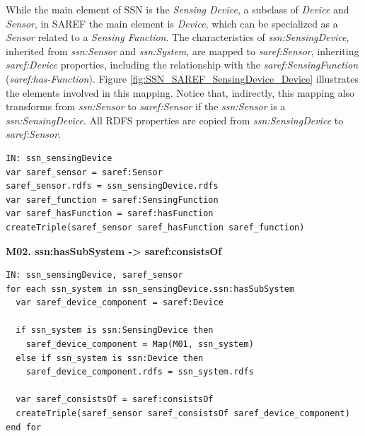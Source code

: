 \documentclass{sig-alternate-05-2015}
\begin{document}
\noindent
While the main element of SSN is the \textit{Sensing Device}, a subclass of \textit{Device} and \textit{Sensor}, in SAREF the main element is \textit{Device}, which can be specialized as a \textit{Sensor} related to a \textit{Sensing Function}. The characteristics of \textit{ssn:\-SensingDevice}, inherited from \textit{ssn:\-Sensor} and \textit{ssn:\-System}, are mapped to \textit{saref:\-Sensor}, inheriting \textit{saref:\-Device} properties, including the relationship with the \textit{saref:\-SensingFunction} (\textit{saref:\-has-Function}). Figure \ref{fig:SSN_SAREF_SensingDevice_Device} illustrates the elements involved in this mapping. Notice that, indirectly, this mapping also transforms from \textit{ssn:\-Sensor} to \textit{saref:\-Sensor} if the \textit{ssn:\-Sensor} is a \textit{ssn:\-SensingDevice}. All RDFS properties are copied from \textit{ssn:\-SensingDevice} to \textit{saref:\-Sensor}. 

\begin{lstlisting}[caption={Pseudocode snippet for M01},label={code:sample},captionpos=b]
IN: ssn_sensingDevice
var saref_sensor = saref:Sensor  
saref_sensor.rdfs = ssn_sensingDevice.rdfs    
var saref_function = saref:SensingFunction  
var saref_hasFunction = saref:hasFunction  
createTriple(saref_sensor saref_hasFunction saref_function)

\end{lstlisting}

\noindent
\newline
\textbf{M02. ssn:\-hasSubSystem -> saref:\-consistsOf}

\begin{lstlisting}[caption={Pseudocode snippet for M02},label={code:sample},captionpos=b]
IN: ssn_sensingDevice, saref_sensor
for each ssn_system in ssn_sensingDevice.ssn:hasSubSystem 
  var saref_device_component = saref:Device 
  
  if ssn_system is ssn:SensingDevice then
    saref_device_component = Map(M01, ssn_system) 
  else if ssn_system is ssn:Device then 
    saref_device_component.rdfs = ssn_system.rdfs 
   
  var saref_consistsOf = saref:consistsOf 
  createTriple(saref_sensor saref_consistsOf saref_device_component)
end for
\end{lstlisting}
\end{document}
